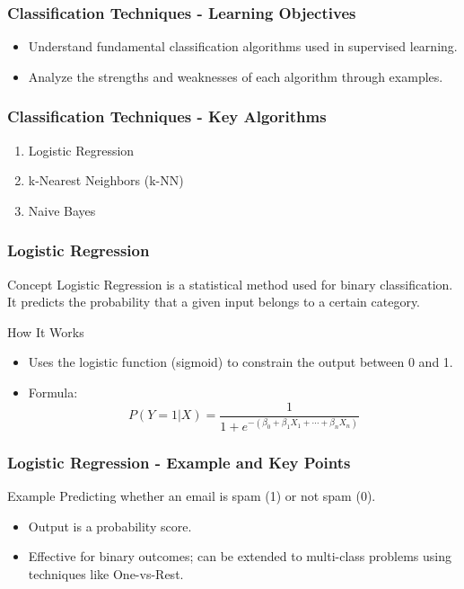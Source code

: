 \documentclass[aspectratio=169]{beamer}
\begin{document}
\begin{frame}[fragile]
    \frametitle{Classification Techniques - Learning Objectives}
    \begin{itemize}
        \item Understand fundamental classification algorithms used in supervised learning.
        \item Analyze the strengths and weaknesses of each algorithm through examples.
    \end{itemize}
\end{frame}

\begin{frame}[fragile]
    \frametitle{Classification Techniques - Key Algorithms}
    \begin{enumerate}
        \item Logistic Regression
        \item k-Nearest Neighbors (k-NN)
        \item Naive Bayes
    \end{enumerate}
\end{frame}

\begin{frame}[fragile]
    \frametitle{Logistic Regression}
    \begin{block}{Concept}
        Logistic Regression is a statistical method used for binary classification. It predicts the probability that a given input belongs to a certain category.
    \end{block}
    \begin{block}{How It Works}
        \begin{itemize}
            \item Uses the logistic function (sigmoid) to constrain the output between 0 and 1.
            \item Formula:
            \[
            P(Y=1|X) = \frac{1}{1 + e^{-(\beta_0 + \beta_1X_1 + \cdots + \beta_nX_n)}}
            \]
        \end{itemize}
    \end{block}
\end{frame}

\begin{frame}[fragile]
    \frametitle{Logistic Regression - Example and Key Points}
    \begin{block}{Example}
        Predicting whether an email is spam (1) or not spam (0).
    \end{block}
    \begin{itemize}
        \item Output is a probability score.
        \item Effective for binary outcomes; can be extended to multi-class problems using techniques like One-vs-Rest.
    \end{itemize}
\end{frame}
\end{document}
